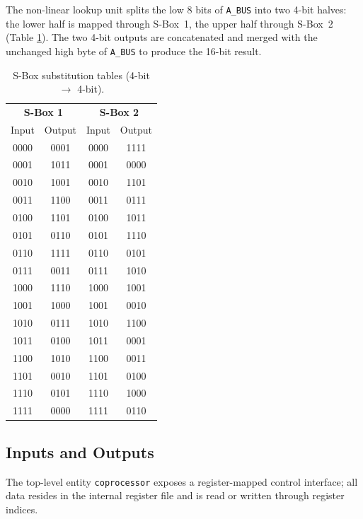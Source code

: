\documentclass[11pt,a4paper]{article}
\begin{document}
The non-linear lookup unit splits the low 8 bits of \texttt{A\_BUS}
into two 4-bit halves: the lower half is mapped through S-Box~1, the
upper half through S-Box~2 (Table \ref{tab:sboxes}). The two 4-bit
outputs are concatenated and merged with the unchanged high byte of
\texttt{A\_BUS} to produce the 16-bit result.

\begin{table}[H]
  \centering
  \caption{S-Box substitution tables (4-bit $\to$ 4-bit).}
  \label{tab:sboxes}
  \small
  \begin{tabular}{@{}cc@{\hspace{1.2cm}}cc@{}}
    \toprule
    \multicolumn{2}{c}{\textbf{S-Box 1}} & \multicolumn{2}{c}{\textbf{S-Box 2}} \\
    Input & Output & Input & Output \\
    \midrule
    0000 & 0001 & 0000 & 1111 \\
    0001 & 1011 & 0001 & 0000 \\
    0010 & 1001 & 0010 & 1101 \\
    0011 & 1100 & 0011 & 0111 \\
    0100 & 1101 & 0100 & 1011 \\
    0101 & 0110 & 0101 & 1110 \\
    0110 & 1111 & 0110 & 0101 \\
    0111 & 0011 & 0111 & 1010 \\
    1000 & 1110 & 1000 & 1001 \\
    1001 & 1000 & 1001 & 0010 \\
    1010 & 0111 & 1010 & 1100 \\
    1011 & 0100 & 1011 & 0001 \\
    1100 & 1010 & 1100 & 0011 \\
    1101 & 0010 & 1101 & 0100 \\
    1110 & 0101 & 1110 & 1000 \\
    1111 & 0000 & 1111 & 0110 \\
    \bottomrule
  \end{tabular}
\end{table}

\subsection{Inputs and Outputs}

The top-level entity \texttt{coprocessor} exposes a register-mapped
control interface; all data resides in the internal register file and
is read or written through register indices.
\end{document}
